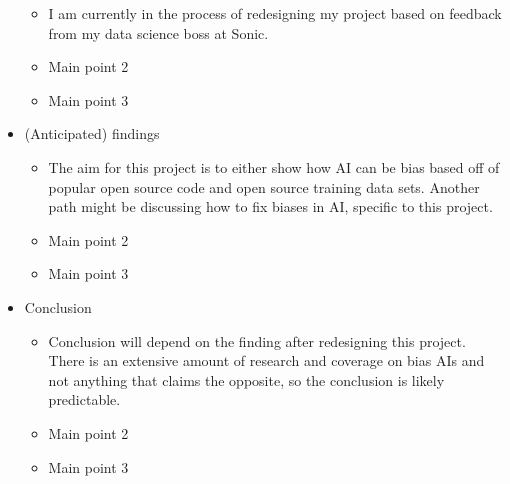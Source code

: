 \documentclass[12pt,english]{article}
\begin{document}
\begin{itemize}
\begin{itemize}
    \item I am currently in the process of redesigning my project based on feedback from my data science boss at Sonic.
    \item Main point 2
    \item Main point 3
    \end{itemize}
\item (Anticipated) findings
    \begin{itemize}
    \item The aim for this project is to either show how AI can be bias based off of popular open source code and open source training data sets. Another path might be discussing how to fix biases in AI, specific to this project.
    \item Main point 2
    \item Main point 3
    \end{itemize}
\item Conclusion
    \begin{itemize}
    \item Conclusion will depend on the finding after redesigning this project. There is an extensive amount of research and coverage on bias AIs and not anything that claims the opposite, so the conclusion is likely predictable.
    \item Main point 2
    \item Main point 3
    \end{itemize}
\end{itemize}


\nocite{*}

\end{document}
